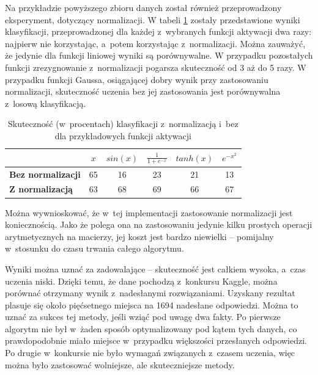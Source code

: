 \documentclass[pl]{minipw} %
\begin{document}
Na przykładzie powyższego zbioru danych został również przeprowadzony eksperyment, dotyczący normalizacji.
W tabeli \ref{tab_norm} zostały przedstawione wyniki klasyfikacji, przeprowadzonej dla każdej z~wybranych funkcji aktywacji dwa razy: najpierw nie korzystając, a~potem korzystając z~normalizacji.
Można zauważyć, że jedynie dla funkcji liniowej wyniki są porównywalne.
W przypadku pozostałych funkcji zrezygnowanie z~normalizacji pogarsza skuteczność od 3 aż do 5 razy.
W przypadku funkcji Gaussa, osiągającej dobry wynik przy zastosowaniu normalizacji, skuteczność uczenia bez jej zastosowania jest porównywalna z~losową klasyfikacją.
\begin{table}[H]
\caption{Skuteczność (w~procentach) klasyfikacji z~normalizacją i~bez dla przykładowych funkcji aktywacji}
\label{tab_norm}
\begin{tabular}{|l|c|c|c|c|c|}
\hline
& $x$ & $sin(x)$ & $\frac{1}{1+e^{-x}}$ & $tanh(x)$ & $e^{-x^2}$ \\
\hline
\textbf{Bez normalizacji} & 65 & 16 & 23 & 21 & 13 \\
\hline
\textbf{Z normalizacją} & 63 & 68 & 69 & 66 & 67 \\
\hline

\hline
\end{tabular}
\end{table}
Można wywnioskować, że w~tej implementacji zastosowanie normalizacji jest koniecznością.
Jako że polega ona na zastosowaniu jedynie kilku prostych operacji arytmetycznych na macierzy, jej koszt jest bardzo niewielki -- pomijalny w~stosunku do czasu trwania całego algorytmu.

Wyniki można uznać za zadowalające -- skuteczność jest całkiem wysoka, a~czas uczenia niski.
Dzięki temu, że dane pochodzą z~konkursu Kaggle, można porównać otrzymany wynik z~nadesłanymi rozwiązaniami.
Uzyskany rezultat plasuje się około pięćsetnego miejsca na 1694 nadesłane odpowiedzi.
Można to uznać za sukces tej metody, jeśli wziąć pod uwagę dwa fakty.
Po pierwsze algorytm nie był w~żaden sposób optymalizowany pod kątem tych danych, co prawdopodobnie miało miejsce w~przypadku większości przesłanych odpowiedzi.
Po drugie w~konkursie nie było wymagań związanych z~czasem uczenia, więc można było zastosować wolniejsze, ale skuteczniejsze metody.
\end{document}
